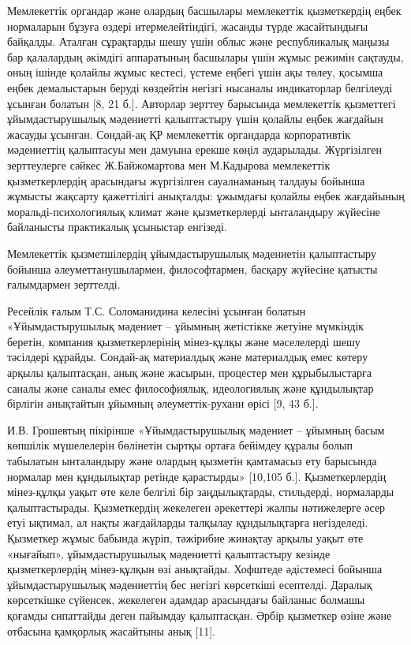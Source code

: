 Мемлекеттік органдар және олардың басшылары мемлекеттік қызметкердің
еңбек нормаларын бұзуға өздері итермелейтіндігі, жасанды түрде
жасайтындығы байқалды. Аталған сұрақтарды шешу үшін облыс және
республикалық маңызы бар қалалардың әкімдігі аппаратының басшылары үшін
жұмыс режимін сақтауды, оның ішінде қолайлы жұмыс кестесі, үстеме еңбегі
үшін ақы төлеу, қосымша еңбек демалыстарын беруді көздейтін негізгі
нысаналы индикаторлар белгілеуді ұсынған болатын {[}8, 21 б.{]}.
Авторлар зерттеу барысында мемлекеттік қызметтегі ұйымдастырушылық
мәдениетті қалыптастыру үшін қолайлы еңбек жағдайын жасауды ұсынған.
Сондай-ақ ҚР мемлекеттік органдарда корпоративтік мәдениеттің қалыптасуы
мен дамуына ерекше көңіл аударылады. Жүргізілген зерттеулерге сәйкес
Ж.Байжомартова мен М.Кадырова мемлекеттік қызметкерлердің арасындағы
жүргізілген сауалнаманың талдауы бойынша жұмысты жақсарту қажеттілігі
анықталды: ұжымдағы қолайлы еңбек жағдайының моральді-психологиялық
климат және қызметкерлерді ынталандыру жүйесіне байланысты практикалық
ұсыныстар енгізеді.

Мемлекеттік қызметшілердің ұйымдастырушылық мәдениетін қалыптастыру
бойынша әлеуметтанушылармен, философтармен, басқару жүйесіне қатысты
ғалымдармен зерттелді.

Ресейлік ғалым Т.С. Соломанидина келесіні ұсынған болатын
«Ұйымдастырушылық мәдениет -- ұйымның жетістікке жетуіне мүмкіндік
беретін, компания қызметкерлерінің мінез-құлқы және мәселелерді шешу
тәсілдері құрайды. Сондай-ақ материалдық және материалдық емес көтеру
арқылы қалыптасқан, анық және жасырын, процестер мен құрыбылыстарға
саналы және саналы емес философиялық, идеологиялық және құндылықтар
бірлігін анықтайтын ұйымның әлеуметтік-рухани өрісі {[}9, 43 б.{]}.

И.В. Грошевтың пікірінше «Ұйымдастырушылық мәдениет -- ұйымның басым
көпшілік мүшелелерін бөлінетін сыртқы ортаға бейімдеу құралы болып
табылатын ынталандыру және олардың қызметін қамтамасыз ету барысында
нормалар мен құндылықтар ретінде қарастырды» {[}10,105 б.{]}.
Қызметкерлердің мінез-құлқы уақыт өте келе белгілі бір заңдылықтарды,
стильдерді, нормаларды қалыптастырады. Қызметкердің жекелеген әрекеттері
жалпы нәтижелерге әсер етуі ықтимал, ал нақты жағдайларды талқылау
құндылықтарға негізделеді. Қызметкер жұмыс бабында жүріп, тәжірибие
жинақтау арқылы уақыт өте «нығайып», ұйымдастырушылық мәдениетті
қалыптастыру кезінде қызметкерлердің мінез-құлқын өзі анықтайды.
Хофштеде әдістемесі бойынша ұйымдастырушылық мәдениеттің бес негізгі
көрсеткіші есептелді. Даралық көрсеткішке сүйенсек, жекелеген адамдар
арасындағы байланыс болмашы қоғамды сипаттайды деген пайымдау
қалыптасқан. Әрбір қызметкер өзіне және отбасына қамқорлық жасайтыны
анық {[}11{]}.

